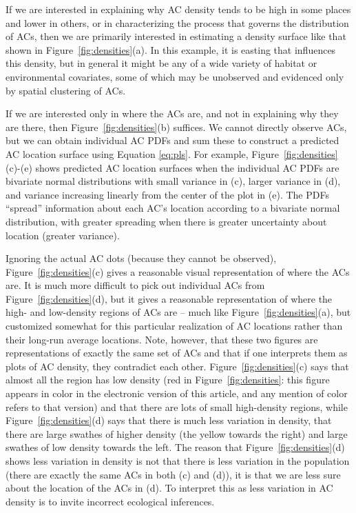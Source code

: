 \documentclass[useAMS,usenatbib,referee]{biom}
\begin{document}
If we are interested in explaining why AC density tends to be high in some places and lower in others, or in characterizing the process that governs the distribution of ACs, then we are primarily interested in estimating a density surface like that shown in Figure~\ref{fig:densities}(a). In this example, it is easting that influences this density, but in general it might be any of a wide variety of habitat or environmental covariates, some of which may be unobserved and evidenced only by spatial clustering of ACs. 

If we are interested only in where the ACs are, and not in explaining why they are there, then Figure~\ref{fig:densities}(b) suffices. We cannot directly observe ACs, but we can obtain individual AC PDFs and sum these to construct a predicted AC location surface using Equation \eqref{eq:pls}. For example, Figure~\ref{fig:densities}(c)-(e) shows predicted AC location surfaces when the individual AC PDFs are bivariate normal distributions with small variance in (c), larger variance in (d), and variance increasing linearly from the center of the plot in (e). The PDFs ``spread'' information about each AC's location according to a bivariate normal distribution, with greater spreading when there is greater uncertainty about location (greater variance).

Ignoring the actual AC dots (because they cannot be observed), Figure~\ref{fig:densities}(c) gives a reasonable visual representation of where the ACs are. It is much more difficult to pick out individual ACs from Figure~\ref{fig:densities}(d), but it gives a reasonable representation of where the high- and low-density regions of ACs are -- much like Figure~\ref{fig:densities}(a), but customized somewhat for this particular realization of AC locations rather than their long-run average locations. Note, however, that these two figures are representations of exactly the same set of ACs and that if one interprets them as plots of AC density, they contradict each other. Figure~\ref{fig:densities}(c) says that almost all the region has low density (red in Figure~\ref{fig:densities}: this figure appears in color in the electronic version of this article, and any mention of color refers to that version) and that there are lots of small high-density regions, while Figure~\ref{fig:densities}(d) says that there is much less variation in density, that there are large swathes of higher density (the yellow towards the right) and large swathes of low density towards the left. The reason that Figure~\ref{fig:densities}(d) shows less variation in density is not that there is less variation in the population (there are exactly the same ACs in both (c) and (d)), it is that we are less sure about the location of the ACs in (d). To interpret this as less variation in AC density is to invite incorrect ecological inferences.
\end{document}
